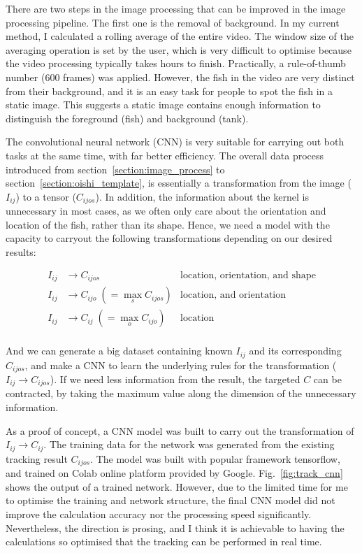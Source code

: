 \documentclass[11pt,twoside]{report}
\begin{document}
There are two steps in the image processing that can be improved in the image processing pipeline. The first one is the removal of background. In my current method, I calculated a rolling average of the entire video. The window size of the averaging operation is set by the user, which is very difficult to optimise because the video processing typically takes hours to finish. Practically, a rule-of-thumb number (600 frames) was applied. However, the fish in the video are very distinct from their background, and it is an easy task for people to spot the fish in a static image. This suggests a static image contains enough information to distinguish the foreground (fish) and background (tank). 

The convolutional neural network (CNN) is very suitable for carrying out both tasks at the same time, with far better efficiency. The overall data process introduced from section~\ref{section:image_process} to section~\ref{section:oishi_template}, is essentially a transformation from the image ($I_{ij}$) to a tensor ($C_{ijos}$). In addition, the information about the kernel is unnecessary in most cases, as we often only care about the orientation and location of the fish, rather than its shape. Hence, we need a model with the capacity to carryout the following transformations depending on our desired results:

$$
\begin{aligned}
I_{ij} &\rightarrow C_{ijos} 
&\textrm{location, orientation, and shape} \\[1ex]
I_{ij} &\rightarrow C_{ijo}\;(= \max_{s}{C_{ijos}})
&\textrm{location, and orientation} \\
I_{ij} &\rightarrow C_{ij}\;(= \max_{o}{C_{ijo}})
& \textrm{location} \\
\end{aligned}
$$

\noindent And we can generate a big dataset containing known $I_{ij}$ and its corresponding $C_{ijos}$, and make a CNN to learn the underlying rules for the transformation ($I_{ij} \rightarrow C_{ijos}$). If we need less information from the result, the targeted $C$ can be contracted, by taking the maximum value along the dimension of the unnecessary information.

As a proof of concept, a CNN model was built to carry out the transformation of $I_{ij} \rightarrow C_{ij}$. The training data for the network was generated from the existing tracking result $C_{ijos}$.
The model was built with popular framework tensorflow, and trained on Colab online platform provided by Google.
Fig.~\ref{fig:track_cnn} shows the output of a trained network. However, due to the limited time for me to optimise the training and network structure, the final CNN model did not improve the calculation accuracy nor the processing speed significantly. Nevertheless, the direction is prosing, and I think it is achievable to having the calculations so optimised that the tracking can be performed in real time.
\end{document}
